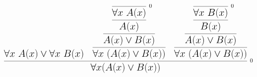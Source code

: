 \documentclass[14pt,border=2pt]{standalone}
\begin{document}
        $$
        \LARGE 

\begin{prooftree}
\hypo{\forall x~ A(x) \lor \forall x~ B(x)} 
\infer0[\normalsize 0]{\forall x~ A(x)} 
\infer1{A(x)}
\infer1{A(x) \lor B(x)} 
\infer1{\forall x~ (A(x) \lor B(x))}
\infer0[\normalsize 0]{\forall x~ B(x)} 
\infer1{B(x)}
\infer1{A(x) \lor B(x)} 
\infer1{\forall x~ (A(x) \lor B(x))}
\infer3[\normalsize 0]{\forall x (A(x) \lor B(x))}
\end{prooftree}
        $$
        
\end{document}
